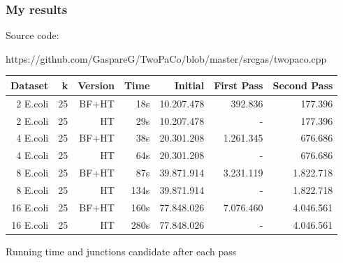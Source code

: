 \documentclass[11pt,svgnames,smaller]{beamer}
\begin{document}
 	
 	
 		\begin{frame}
		\frametitle{My results}
		\centering
		
    Source code:
    
    {\color{blue}https://github.com/GaspareG/TwoPaCo/blob/master/srcgas/twopaco.cpp}
		
		\bigskip
		
			\begin{tabular}{ | r | r | r | r | r | r | r | }
      \hline
        Dataset &  k & Version & Time &    Initial & First Pass & Second Pass \\ \hline
        
       2 E.coli & 25 & BF+HT   &  {\color{green}18s}  & 10.207.478 &    392.836 &     177.396 \\ 
       2 E.coli & 25 & HT      &    {\color{red}29s}  & 10.207.478 &          - &     177.396 \\ \hline
       
       4 E.coli & 25 & BF+HT   &  {\color{green}38s}  & 20.301.208 &  1.261.345 &     676.686 \\ 
       4 E.coli & 25 & HT      &    {\color{red}64s}  & 20.301.208 &          - &     676.686 \\ \hline
       
       8 E.coli & 25 & BF+HT   &  {\color{green}87s}  & 39.871.914 &  3.231.119 &   1.822.718 \\ 
       8 E.coli & 25 & HT      &   {\color{red}134s}  & 39.871.914 &          - &   1.822.718 \\ \hline
       
      16 E.coli & 25 & BF+HT   & {\color{green}160s}  & 77.848.026 &  7.076.460 &   4.046.561 \\ 
      16 E.coli & 25 & HT      &   {\color{red}280s}  & 77.848.026 &          - &   4.046.561 \\ 
      \hline
      \end{tabular}

      \medskip
      
  		Running time and junctions candidate after each pass
  		
 	\end{frame}
  
\end{document}
